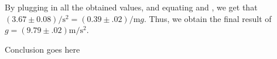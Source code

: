 \begin{paper}

By plugging in all the obtained values, and equating \eqR and \eqS, we get that
$(3.67\pm0.08)\si{\per\second\squared}=(0.39\pm.02)\si{\per\metre}g$.
Thus, we obtain the final result of $g=(9.79\pm.02)\si{\metre\per\second\squared}$.


	Conclusion goes here
	


\end{paper}
